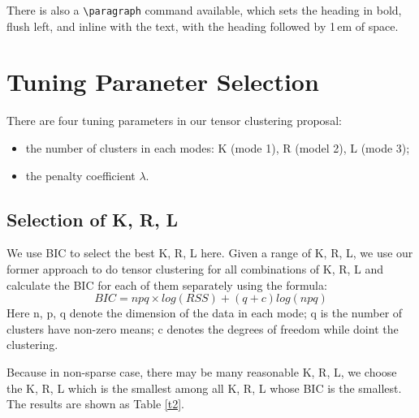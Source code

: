\documentclass{article}
\begin{document}
There is also a \verb+\paragraph+ command available, which sets the heading in
bold, flush left, and inline with the text, with the heading followed by 1\,em
of space.
\section{Tuning Paraneter Selection}
There are four tuning parameters in our tensor clustering proposal: 
\begin{itemize}
	\item the number of clusters in each modes: K (mode 1), R (model 2), L (mode 3);
	\item the penalty coefficient $\lambda$.
\end{itemize}
\subsection{Selection of K, R, L}
We use BIC to select the best K, R, L here. Given a range of K, R, L, we use our former approach to do tensor clustering for all combinations of K, R, L and calculate the BIC for each of them separately using the formula:
\begin{equation*}
	BIC = npq\times log(RSS)+(q+c)log(npq)
\end{equation*}
Here n, p, q denote the dimension of the data in each mode; q is the number of clusters have non-zero means; c denotes the degrees of freedom while doint the clustering.\par 
 Because in non-sparse case, there may be many reasonable K, R, L, we choose the K, R, L which is the smallest among all K, R, L whose BIC is the smallest. The results are shown as Table \ref{t2}. 
\end{document}
